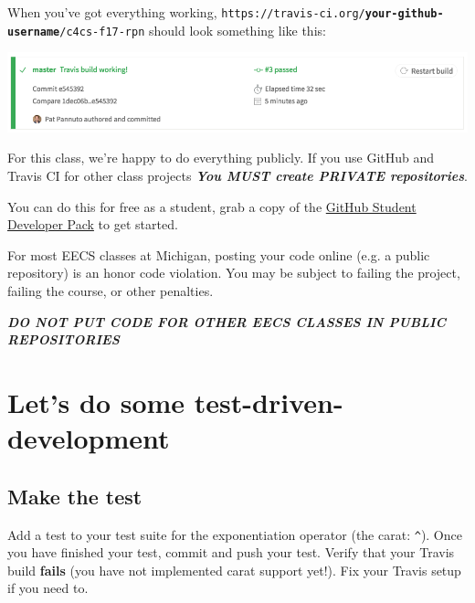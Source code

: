 \documentclass{article}
\begin{document}
When you've got everything working,
\texttt{https://travis-ci.org/\textbf{your-github-username}/c4cs-f17-rpn}
should look something like this:

\includegraphics[width=\linewidth]{travis-rpn-working}


\vfill

\begin{mdframed}\centering
For this class, we're happy to do everything publicly. If you use GitHub and
Travis CI for other class projects
\textbf{\emph{\large You MUST create PRIVATE repositories}}.

You can do this for free as a student, grab a copy of the
\href{https://education.github.com/pack}{GitHub Student Developer Pack} to get
started.

{\color{red}
  For most EECS classes at Michigan, posting your code online (e.g. a public
  repository) is an honor code violation. You may be subject to failing the
  project, failing the course, or other penalties.

  \textbf{\emph{\Large DO NOT PUT CODE FOR OTHER EECS CLASSES IN PUBLIC REPOSITORIES}}
}
\end{mdframed}










\newpage

\section{Let's do some test-driven-development}

\subsection{Make the test}
Add a test to your test suite for the exponentiation operator (the carat:
\texttt{\^{}}). Once you have finished your test, commit and push your test.
Verify that your Travis build \textbf{fails} (you have not implemented carat
support yet!). Fix your Travis setup if you need to.
\end{document}
